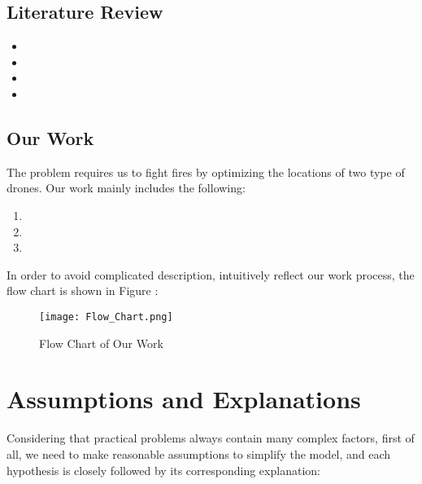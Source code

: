 \documentclass[12pt]{article}  %
\begin{document}
\subsection{Literature Review} %

\begin{itemize}
\setlength{\parsep}{0ex} %
\setlength{\topsep}{2ex} %
\setlength{\itemsep}{1ex} %
\item 

\item
 
\item 

\item 

\end{itemize}


\subsection{Our Work} %
The problem requires us to fight fires by optimizing the locations of two type of drones. Our work mainly includes the following:
\begin{enumerate}[\bfseries 1.]
    \setlength{\parsep}{0ex} %
    \setlength{\topsep}{0.5pt} %
    \setlength{\itemsep}{0.5pt} %
    \item 
    \item 
    \item 
\end{enumerate}
In order to avoid complicated description, intuitively reflect our work process, the flow chart is shown in Figure :

\begin{figure}[htbp]  %
\centering  %
\texttt{[image: Flow\_Chart.png]} %
\caption{Flow Chart of Our Work} %
\end{figure}
\vspace{-0.8cm}

\section{Assumptions and Explanations} %
Considering that practical problems always contain many complex factors, first of all, we need to make reasonable assumptions to simplify the model, and each hypothesis is closely followed by its corresponding explanation:
\end{document}
